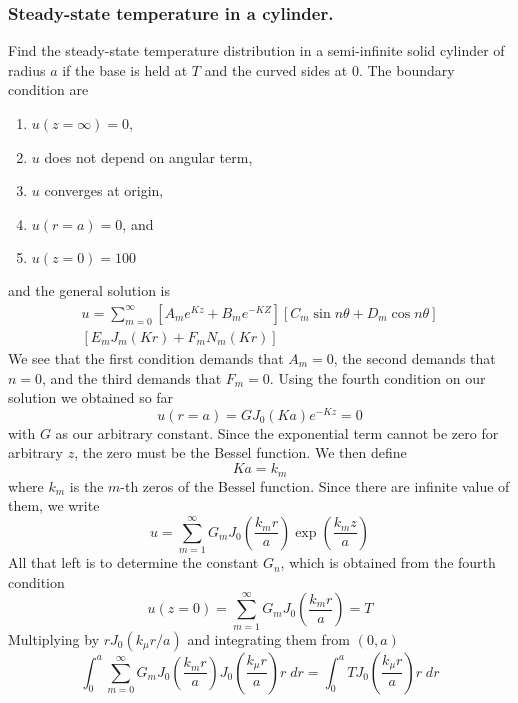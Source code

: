 \documentclass[../../main.tex]{subfiles}
\begin{document}
\subsubsection{Steady-state temperature in a cylinder.} Find the steady-state temperature distribution in a semi-infinite solid cylinder of radius $a$ if the base is held at $T$ and the curved sides at 0\textdegree. The boundary condition are 
\begin{enumerate}
  \item $u(z=\infty)=0$,
  \item $u$ does not depend on angular term,
  \item $u$ converges at origin,
  \item $u(r=a)=0$, and
  \item $u(z=0)=100$
\end{enumerate}
and the general solution is 
\begin{multline*}
  u=\sum_{m=0}^{\infty}\left[A_me^{Kz}+B_me^{-KZ}\right]\left[C_m\sin n\theta +D_m\cos n\theta\right]\\
  \left[E_mJ_m(Kr)+F_mN_m(Kr)\right]
\end{multline*}
We see that the first condition demands that $A_m=0$, the second demands that $n=0$, and the third demands that $F_m=0$. Using the fourth condition on our solution we obtained so far
\begin{equation*}
  u(r=a)=GJ_0(Ka)e^{-Kz}=0
\end{equation*}
with $G$ as our arbitrary constant. Since the exponential term cannot be zero for arbitrary $z$, the zero must be the Bessel function. We then define 
\begin{equation*}
  Ka=k_m
\end{equation*}
where $k_m$ is the $m$-th zeros of the Bessel function. Since there are infinite value of them, we write 
\begin{equation*}
  u=\sum_{m=1}^{\infty}G_mJ_0\left(\frac{k_mr}{a}\right)\exp\left(\frac{k_mz}{a}\right)
\end{equation*}
All that left is to determine the constant $G_n$, which is obtained from the fourth condition
\begin{equation*}
  u(z=0)=\sum_{m=1}^{\infty}G_mJ_0\left(\frac{k_mr}{a}\right)=T
\end{equation*} 
Multiplying by $rJ_0(k_\mu r/a)$ and integrating them from $(0,a)$
\begin{equation*}
  \int_{0}^{a}\sum_{m=0}^{\infty}G_mJ_0\left(\frac{k_mr}{a}\right)J_0\left(\frac{k_\mu r}{a}\right)r\;dr=\int_{0}^{a}TJ_0\left(\frac{k_\mu r}{a}\right)r\;dr
\end{equation*}
\end{document}
